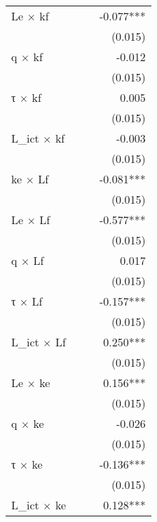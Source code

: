 \begin{tabular}{lrrr}
Le $\times$ kf         &            &            &  -0.077*** \\ 
                       &            &            &    (0.015) \\ 
q $\times$ kf          &            &            &     -0.012 \\ 
                       &            &            &    (0.015) \\ 
τ $\times$ kf          &            &            &      0.005 \\ 
                       &            &            &    (0.015) \\ 
L\_ict $\times$ kf     &            &            &     -0.003 \\ 
                       &            &            &    (0.015) \\ 
ke $\times$ Lf         &            &            &  -0.081*** \\ 
                       &            &            &    (0.015) \\ 
Le $\times$ Lf         &            &            &  -0.577*** \\ 
                       &            &            &    (0.015) \\ 
q $\times$ Lf          &            &            &      0.017 \\ 
                       &            &            &    (0.015) \\ 
τ $\times$ Lf          &            &            &  -0.157*** \\ 
                       &            &            &    (0.015) \\ 
L\_ict $\times$ Lf     &            &            &   0.250*** \\ 
                       &            &            &    (0.015) \\ 
Le $\times$ ke         &            &            &   0.156*** \\ 
                       &            &            &    (0.015) \\ 
q $\times$ ke          &            &            &     -0.026 \\ 
                       &            &            &    (0.015) \\ 
τ $\times$ ke          &            &            &  -0.136*** \\ 
                       &            &            &    (0.015) \\ 
L\_ict $\times$ ke     &            &            &   0.128*** \\ 

\end{tabular}
